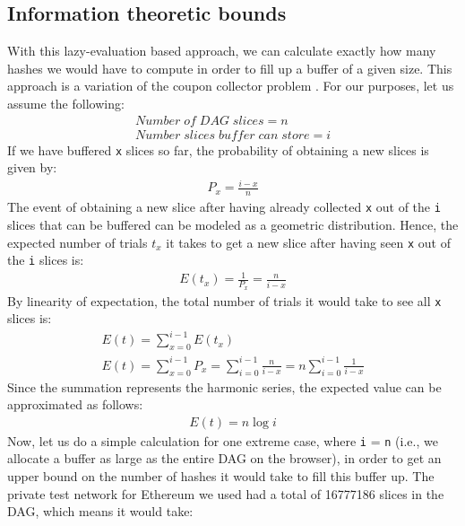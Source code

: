 \documentclass[10pt, conference, compsocconf]{IEEEtran}
\begin{document}

\subsection{Information theoretic bounds}
With this lazy-evaluation based approach, we can calculate exactly how many hashes we would have to compute in order to fill up a buffer of a given size. This approach is a variation of the coupon collector problem \cite{couponCollector}. For our purposes, let us assume the following:
\begin{gather}
    Number\;of\;DAG\;slices = n\\
    Number\;slices\;buffer\;can\;store = i
\end{gather}
If we have buffered \verb|x| slices so far, the probability of obtaining a new slices is given by:
\begin{gather}
  P_x = \frac{i-x}{n}
\end{gather}
The event of obtaining a new slice after having already collected \verb|x| out of the \verb|i| slices that can be buffered can be modeled as a geometric distribution. Hence, the expected number of trials $t_x$ it takes to get a new  slice after having seen \verb|x| out of the \verb|i| slices is:
\begin{gather}
  E(t_x) = \frac{1}{P_x} = \frac{n}{i-x}
\end{gather}
By linearity of expectation, the total number of trials it would take to see all \verb|x| slices is:
\begin{gather}
  E(t) = \sum_{x=0}^{i-1}E(t_x)\\
    E(t) = \sum_{x=0}^{i-1}P_x = \sum_{i=0}^{i-1}\frac{n}{i-x} = n\sum_{i=0}^{i-1}\frac{1}{i-x}
\end{gather}
Since the summation represents the harmonic series, the expected value can be approximated as follows:
\begin{gather}
  E(t) = n\log{i}
\end{gather}
Now, let us do a simple calculation for one extreme case, where \verb|i| = \verb|n| (i.e., we allocate a buffer as large as the entire DAG on the browser), in order to get an upper bound on the number of hashes it would take to fill this buffer up. The private test network for Ethereum we used had a total of 16777186 slices in the DAG, which means it would take:
\end{document}
